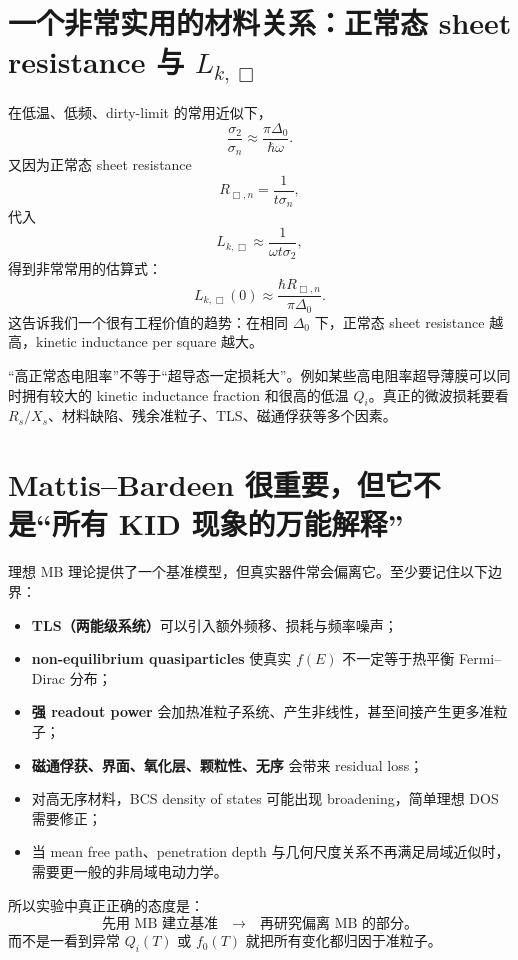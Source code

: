 \documentclass[11pt,a4paper,openany]{ctexrep}
\begin{document}
\section{一个非常实用的材料关系：正常态 sheet resistance 与 $L_{k,\Box}$}

在低温、低频、dirty-limit 的常用近似下，
\[
\frac{\sigma_2}{\sigma_n}\approx\frac{\pi\Delta_0}{\hbar\omega}.
\]
又因为正常态 sheet resistance
\[
R_{\Box,n}=\frac{1}{t\sigma_n},
\]
代入
\[
L_{k,\Box}\approx\frac{1}{\omega t\sigma_2},
\]
得到非常常用的估算式：
\[
\boxed{
L_{k,\Box}(0)
\approx
\frac{\hbar R_{\Box,n}}{\pi\Delta_0}.
}
\]
这告诉我们一个很有工程价值的趋势：在相同 $\Delta_0$ 下，正常态 sheet resistance 越高，kinetic inductance per square 越大。

\begin{mistakebox}
“高正常态电阻率”不等于“超导态一定损耗大”。例如某些高电阻率超导薄膜可以同时拥有较大的 kinetic inductance fraction 和很高的低温 $Q_i$。真正的微波损耗要看 $R_s/X_s$、材料缺陷、残余准粒子、TLS、磁通俘获等多个因素。
\end{mistakebox}

\section{Mattis--Bardeen 很重要，但它不是“所有 KID 现象的万能解释”}

理想 MB 理论提供了一个基准模型，但真实器件常会偏离它。至少要记住以下边界：
\begin{itemize}
  \item \textbf{TLS（两能级系统）}可以引入额外频移、损耗与频率噪声；
  \item \textbf{non-equilibrium quasiparticles} 使真实 $f(E)$ 不一定等于热平衡 Fermi--Dirac 分布；
  \item \textbf{强 readout power} 会加热准粒子系统、产生非线性，甚至间接产生更多准粒子；
  \item \textbf{磁通俘获、界面、氧化层、颗粒性、无序} 会带来 residual loss；
  \item 对高无序材料，BCS density of states 可能出现 broadening，简单理想 DOS 需要修正；
  \item 当 mean free path、penetration depth 与几何尺度关系不再满足局域近似时，需要更一般的非局域电动力学。
\end{itemize}

所以实验中真正正确的态度是：
\[
\boxed{
\text{先用 MB 建立基准}
\quad\rightarrow\quad
\text{再研究偏离 MB 的部分。}
}
\]
而不是一看到异常 $Q_i(T)$ 或 $f_0(T)$ 就把所有变化都归因于准粒子。
\end{document}

